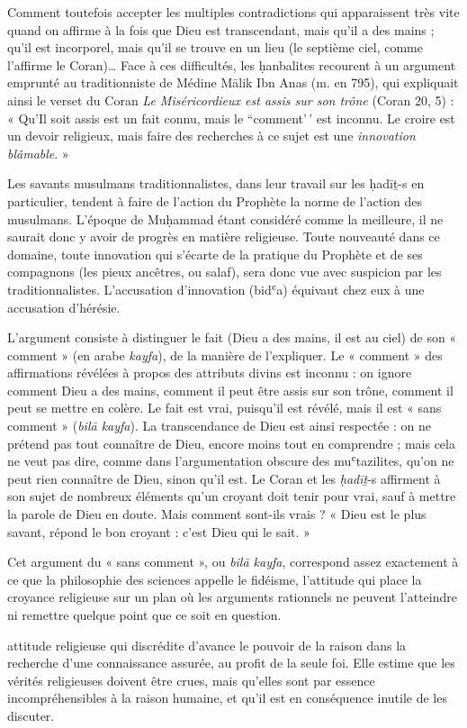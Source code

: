 Comment toutefois accepter les multiples contradictions qui apparaissent
très vite quand on affirme à la fois que Dieu est transcendant, mais
qu'il a des mains ; qu'il est incorporel, mais qu'il se trouve en un
lieu (le septième ciel, comme l'affirme le Coran)\ldots{} Face à ces
difficultés, les ḥanbalites recourent à un argument emprunté au
traditionniste de Médine Mālik Ibn Anas (m. en 795), qui expliquait
ainsi le verset du Coran \emph{Le Miséricordieux est assis sur son
trône} (Coran 20, 5) : « Qu'Il soit assis est un fait connu, mais le
``comment'\,' est inconnu. Le croire est un devoir religieux, mais faire
des recherches à ce sujet est une \emph{innovation blâmable}. »
\begin{Def}
 Les savants musulmans traditionnalistes, dans leur travail sur les ḥadīṯ-s en particulier, tendent à faire de l’action du Prophète la norme de l’action des musulmans. L’époque de Muḥammad étant considéré comme la meilleure, il ne saurait donc y avoir de progrès en matière religieuse. Toute nouveauté dans ce domaine, toute innovation qui s’écarte de la pratique du Prophète et de ses compagnons (les pieux ancêtres, ou salaf), sera donc vue avec suspicion par les traditionnalistes. L’accusation d’innovation (bidʿa) équivaut chez eux à une accusation d’hérésie. 
\end{Def}

L'argument consiste à distinguer le fait (Dieu a des mains, il est au
ciel) de son
« comment » (en arabe \emph{kayfa}), de la manière de l'expliquer. Le «
comment » des affirmations révélées à propos des attributs divins est
inconnu : on ignore comment Dieu a des mains, comment il peut être assis
sur son trône, comment il peut se mettre en colère. Le fait est vrai,
puisqu'il est révélé, mais il est « sans comment » (\emph{bilā kayfa}).
La transcendance de Dieu est ainsi respectée : on ne prétend pas tout
connaître de Dieu, encore moins tout en comprendre ; mais cela ne veut
pas dire, comme dans l'argumentation obscure des muʿtazilites, qu'on ne
peut rien connaître de Dieu, sinon qu'il est. Le Coran et les
\emph{ḥadīṯ}-s affirment à son sujet de nombreux éléments qu'un croyant
doit tenir pour vrai, sauf à mettre la parole de Dieu en doute. Mais
comment sont-ils vrais ? « Dieu est le plus savant, répond le bon
croyant : c'est Dieu qui le sait. »

Cet argument du « sans comment », ou \emph{bilā kayfa}, correspond assez
exactement à ce que la philosophie des sciences appelle le fidéisme,
l'attitude qui place la croyance religieuse sur un plan où les arguments
rationnels ne peuvent l'atteindre ni remettre quelque point que ce soit
en question.
\begin{Def}[Fidéisme] attitude religieuse qui discrédite d’avance le pouvoir de la raison dans la recherche d’une connaissance assurée, au profit de la seule foi. Elle estime que les vérités religieuses doivent être crues, mais qu’elles sont par essence incompréhensibles à la raison humaine, et qu’il est en conséquence inutile de les discuter. 
\end{Def}
